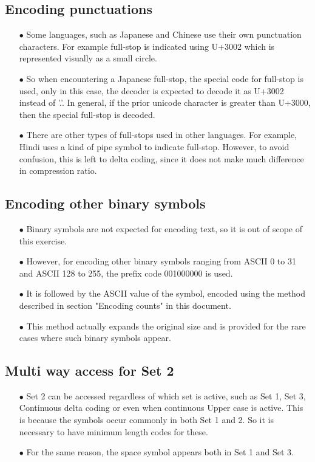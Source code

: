 \documentclass[]{article}
\begin{document}
\subsection{Encoding punctuations}
\begin{itemize}
	\item[$\bullet$] Some languages, such as Japanese and Chinese use their own punctuation characters.  For example full-stop is indicated using U+3002 which is represented visually as a small circle.
	\item[$\bullet$] So when encountering a Japanese full-stop, the special code for full-stop is used, only in this case, the decoder is expected to decode it as U+3002 instead of '.'.  In general, if the prior unicode character is greater than U+3000, then the special full-stop is decoded.
	\item[$\bullet$] There are other types of full-stops used in other languages.  For example, Hindi uses a kind of pipe symbol to indicate full-stop.  However, to avoid confusion, this is left to delta coding, since it does not make much difference in compression ratio.
\end{itemize}

\subsection{Encoding other binary symbols}
\begin{itemize}
	\item[$\bullet$]Binary symbols are not expected for encoding text, so it is out of scope of this exercise.
	\item[$\bullet$] However, for encoding other binary symbols ranging from ASCII 0 to 31 and ASCII 128 to 255, the prefix code 001000000 is used.
	\item[$\bullet$] It is followed by the ASCII value of the symbol, encoded using the method described in section "Encoding counts" in this document.
	\item[$\bullet$] This method actually expands the original size and is provided for the rare cases where such binary symbols appear.
\end{itemize}

\subsection{Multi way access for Set 2}
\begin{itemize}
	\item[$\bullet$] Set 2 can be accessed regardless of which set is active, such as Set 1, Set 3, Continuous delta coding or even when continuous Upper case is active.  This is because the symbols occur commonly in both Set 1 and 2.  So it is necessary to have minimum length codes for these.
	\item[$\bullet$] For the same reason, the space symbol appears both in Set 1 and Set 3.
\end{itemize}
\end{document}
